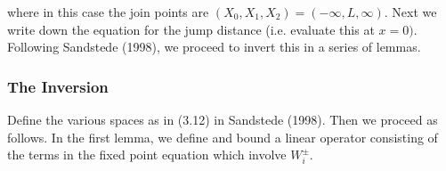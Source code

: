 \documentclass[12pt]{article}
\begin{document}
where in this case the join points are $(X_0, X_1, X_2) = (-\infty, L, \infty)$. Next we write down the equation for the jump distance (i.e. evaluate this at $x = 0)$. \\

Following Sandstede (1998), we proceed to invert this in a series of lemmas. 

\subsubsection*{The Inversion}

Define the various spaces as in (3.12) in Sandstede (1998). Then we proceed as follows. In the first lemma, we define and bound a linear operator consisting of the terms in the fixed point equation which involve $W_i^\pm$.
\end{document}
